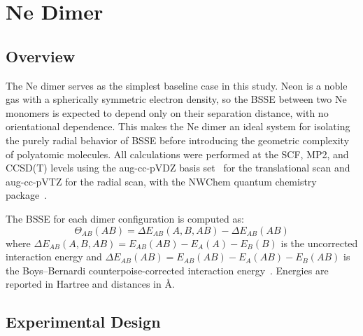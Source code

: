 
\section{Ne Dimer}

\subsection{Overview}

The Ne dimer serves as the simplest baseline case in this study. Neon
is a noble gas with a spherically symmetric electron density, so the
BSSE between two Ne monomers is expected to depend only on their
separation distance, with no orientational dependence. This makes the
Ne dimer an ideal system for isolating the purely radial behavior of
BSSE before introducing the geometric complexity of polyatomic
molecules. All calculations were performed at the SCF, MP2, and
CCSD(T) levels using the aug-cc-pVDZ basis set~\cite{dunning1989,kendall1992}
for the translational scan and aug-cc-pVTZ for the radial scan, with
the NWChem quantum chemistry package~\cite{nwchem2020}.

The BSSE for each dimer configuration is computed as:
\begin{equation}
    \Theta_{AB}(AB) = \Delta E_{AB}(A, B, AB) - \Delta E_{AB}(AB)
    \label{eq:ne_dimer_bsse}
\end{equation}
where $\Delta E_{AB}(A, B, AB) = E_{AB}(AB) - E_A(A) - E_B(B)$ is the
uncorrected interaction energy and $\Delta E_{AB}(AB) = E_{AB}(AB) -
E_A(AB) - E_B(AB)$ is the Boys--Bernardi counterpoise-corrected
interaction energy~\cite{boys1970}. Energies are reported in Hartree
and distances in \AA.

\subsection{Experimental Design}

